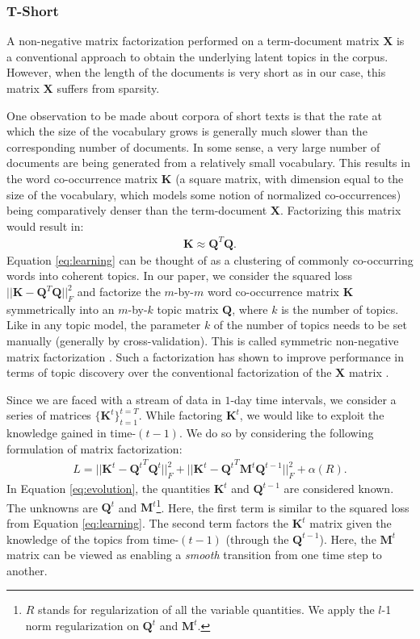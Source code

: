 \subsubsection{T-Short}
A non-negative matrix factorization performed on a term-document matrix $\textbf{X}$ is a conventional
approach to obtain the underlying latent topics in the corpus.  However, when the length of the documents
is very short as in our case, this matrix $\textbf{X}$ suffers from sparsity.  

One observation to be made about corpora of short texts is that the rate at which the
size of the vocabulary grows is generally much slower than the corresponding
number of documents.
In some sense, a very large number of documents are being generated from a relatively
small vocabulary.  This results in
the word co-occurrence matrix $\textbf{K}$ (a square matrix, with dimension equal to the size of the
vocabulary, which models some notion of normalized co-occurrences) 
being comparatively denser than the term-document $\textbf{X}$.  
Factorizing this matrix would result in:
\begin{eqnarray}
    \textbf{K} \approx \textbf{Q}^{T}\textbf{Q}. \label{eq:learning}
\end{eqnarray}
Equation \ref{eq:learning} can be thought of as a clustering of commonly co-occurring words 
into coherent topics.  
In our paper, we consider the squared loss $||\textbf{K} - \textbf{Q}^T\textbf{Q}||_F^2$
and factorize the $m$-by-$m$ word co-occurrence matrix $\textbf{K}$ symmetrically into 
an $m$-by-$k$ topic matrix $\textbf{Q}$, where $k$ is the number of topics.  Like in any topic model, the parameter $k$ of the number of topics
needs to be set manually (generally by cross-validation).
This is called symmetric 
non-negative matrix factorization \cite{Kuang:2012}.
Such a factorization has shown to improve performance in terms of topic discovery
over the conventional factorization of the $\textbf{X}$ matrix \cite{Yan:2013}.

Since we are faced with a stream of data in $1$-day time intervals, we consider a series of
matrices $\{\textbf{K}^t\}_{t=1}^{t=T}$.  While factoring $\textbf{K}^t$, we would like to 
exploit the knowledge gained in time-$(t-1)$.  We do so by considering the following
formulation of matrix factorization:
\begin{eqnarray}
L = ||\textbf{K}^{t} - {\textbf{Q}^{t}}^{T}\textbf{Q}^{t} ||^2_F+ ||\textbf{K}^{t} - {\textbf{Q}^{t}}^{T}\textbf{M}^{t}\textbf{Q}^{t-1}||^2_F + \alpha(R). \label{eq:evolution}
\end{eqnarray}
In Equation \ref{eq:evolution}, the quantities $\textbf{K}^t$ and $\textbf{Q}^{t-1}$ are considered known.  The unknowns are
$\textbf{Q}^t$ and $\textbf{M}^t$\footnote{$R$ stands for regularization of all the variable quantities.  
We apply the $l$-1 norm regularization on
$\textbf{Q}^t$ and $\textbf{M}^t$.}.  Here, the first term is similar to the squared loss from Equation \ref{eq:learning}.
The second term factors the $\textbf{K}^t$ matrix given the knowledge of the topics from time-$(t-1)$ (through
the $\textbf{Q}^{t-1}$).  Here, the $\textbf{M}^{t}$ matrix can be viewed as enabling a \emph{smooth} transition
from one time step to another.  

